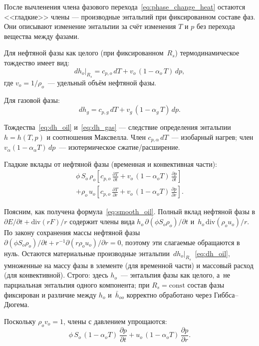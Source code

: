 \documentclass[12pt,a4paper]{article}
\begin{document}
После вычленения члена фазового перехода~\eqref{eq:phase_change_heat}
остаются <<гладкие>> члены --- производные энтальпий при фиксированном
составе фаз. Они описывают изменение энтальпии за счёт изменения
$T$ и $p$ без перехода вещества между фазами.

Для нефтяной фазы как целого (при фиксированном~$R_s$) термодинамическое
тождество имеет вид:
\begin{equation}\label{eq:dh_oil}
  dh_o\big|_{R_s} = c_{p,o}\,dT + v_o\,(1 - \alpha_o\,T)\,dp,
\end{equation}
где $v_o = 1/\rho_o$~--- удельный объём нефтяной фазы.

Для газовой фазы:
\begin{equation}\label{eq:dh_gas}
  dh_g = c_{p,g}\,dT + v_g\,(1 - \alpha_g\,T)\,dp.
\end{equation}

Тождества~\eqref{eq:dh_oil} и~\eqref{eq:dh_gas} --- следствие определения
энтальпии $h = h(T,p)$ и соотношения Максвелла. Член $c_{p,\alpha}\,dT$~---
изобарный нагрев; член $v_\alpha(1 - \alpha_\alpha T)\,dp$~---
изотермическое сжатие/расширение.

Гладкие вклады от нефтяной фазы (временная и конвективная части):
\begin{multline}\label{eq:smooth_oil}
  \phi\,S_o\,\rho_o\!\left[
    c_{p,o}\,\frac{\partial T}{\partial t}
    + v_o\,(1-\alpha_o T)\,\frac{\partial p}{\partial t}
  \right] \\
  + \rho_o\,u_o\!\left[
    c_{p,o}\,\frac{\partial T}{\partial r}
    + v_o\,(1-\alpha_o T)\,\frac{\partial p}{\partial r}
  \right].
\end{multline}

Поясним, как получена формула~\eqref{eq:smooth_oil}. Полный
вклад нефтяной фазы в $\partial E/\partial t + \mathrm{div}(rF)/r$
содержит члены вида $h_o\,\partial(\phi S_o\rho_o)/\partial t$
и~$h_o\,\mathrm{div}(\rho_o u_o)/r$. По закону сохранения
массы нефтяной фазы $\partial(\phi S_o\rho_o)/\partial t
+ r^{-1}\partial(r\rho_o u_o)/\partial r = 0$, поэтому эти
слагаемые обращаются в нуль. Остаются материальные производные
энтальпии~$dh_o|_{R_s}$~\eqref{eq:dh_oil}, умноженные на массу
фазы в элементе (для временной части) и массовый расход (для
конвективной). Строго: здесь $h_o$~--- энтальпия фазы как целого,
а~не парциальная энтальпия одного компонента; при $R_s = \mathrm{const}$
состав фазы фиксирован и различие между $h_o$ и~$\bar{h}_{oo}$
корректно обработано через Гиббса--Дюгема.

Поскольку $\rho_o v_o = 1$, члены с давлением
упрощаются:
\begin{equation}\label{eq:smooth_oil_p}
  \phi\,S_o\,(1-\alpha_o T)\,\frac{\partial p}{\partial t}
  + u_o\,(1-\alpha_o T)\,\frac{\partial p}{\partial r}.
\end{equation}
\end{document}
